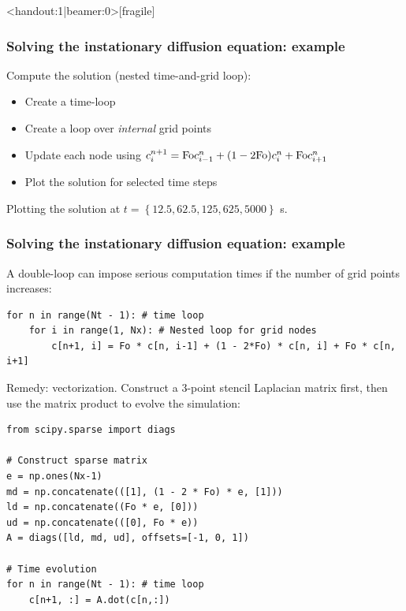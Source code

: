 \begin{frame}<handout:1|beamer:0>[fragile]
  \frametitle{Solving the instationary diffusion equation: example}
  Compute the solution (nested time-and-grid loop):
  \begin{itemize}
      \item Create a time-loop
      \item Create a loop over \emph{internal} grid points
      \item Update each node using $c_i^{n+1} = \text{Fo} c_{i-1}^n + (1-2\text{Fo})c_i^n + \text{Fo} c_{i+1}^n$
      \item Plot the solution for selected time steps
  \end{itemize}
  \pause
  Plotting the solution at $t=\left\{12.5,62.5,125,625,5000\right\}$ \si{\second}.
\end{frame}

\begin{frame}[fragile]
  \frametitle{Solving the instationary diffusion equation: example}
  A double-loop can impose serious computation times if the number of grid points increases:
  \begin{lstlisting}
for n in range(Nt - 1): # time loop
    for i in range(1, Nx): # Nested loop for grid nodes
        c[n+1, i] = Fo * c[n, i-1] + (1 - 2*Fo) * c[n, i] + Fo * c[n, i+1]
\end{lstlisting}
Remedy: vectorization. Construct a 3-point stencil Laplacian matrix first, then use the matrix product to evolve the simulation:
\begin{lstlisting}
from scipy.sparse import diags

# Construct sparse matrix
e = np.ones(Nx-1)
md = np.concatenate(([1], (1 - 2 * Fo) * e, [1]))
ld = np.concatenate((Fo * e, [0]))
ud = np.concatenate(([0], Fo * e))
A = diags([ld, md, ud], offsets=[-1, 0, 1])

# Time evolution
for n in range(Nt - 1): # time loop
    c[n+1, :] = A.dot(c[n,:])
\end{lstlisting}
\end{frame}


